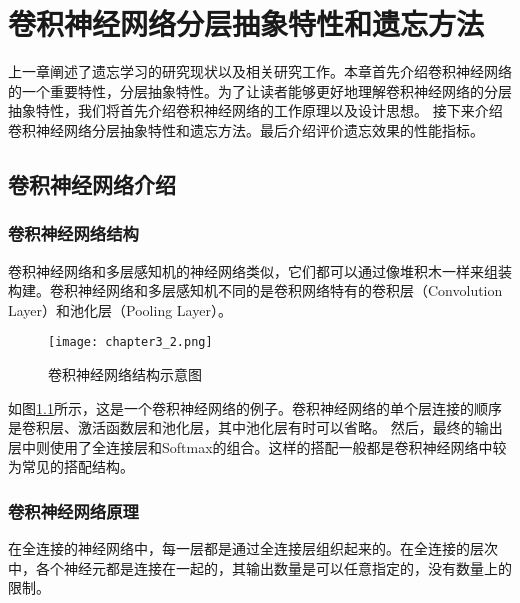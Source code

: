 
\chapter{卷积神经网络分层抽象特性和遗忘方法}
上一章阐述了遗忘学习的研究现状以及相关研究工作。本章首先介绍卷积神经网络的一个重要特性，分层抽象特性。为了让读者能够更好地理解卷积神经网络的分层抽象特性，我们将首先介绍卷积神经网络的工作原理以及设计思想。
接下来介绍卷积神经网络分层抽象特性和遗忘方法。最后介绍评价遗忘效果的性能指标。

\section{卷积神经网络介绍}

\subsection{卷积神经网络结构}

卷积神经网络和多层感知机的神经网络类似，它们都可以通过像堆积木一样来组装构建。卷积神经网络和多层感知机不同的是卷积网络特有的卷积层（Convolution Layer）和池化层（Pooling Layer）。

\begin{figure}
    \centering
    \texttt{[image: chapter3\_2.png]}
    \caption{卷积神经网络结构示意图\cite{luyujie_216}}
    \label{fig:chapter3_2}
\end{figure}

如图\ref{fig:chapter3_2}所示，这是一个卷积神经网络的例子。卷积神经网络的单个层连接的顺序是卷积层、激活函数层和池化层，其中池化层有时可以省略。
然后，最终的输出层中则使用了全连接层和Softmax的组合。这样的搭配一般都是卷积神经网络中较为常见的搭配结构。

\subsection{卷积神经网络原理}
在全连接的神经网络中，每一层都是通过全连接层组织起来的。在全连接的层次中，各个神经元都是连接在一起的，其输出数量是可以任意指定的，没有数量上的限制。

